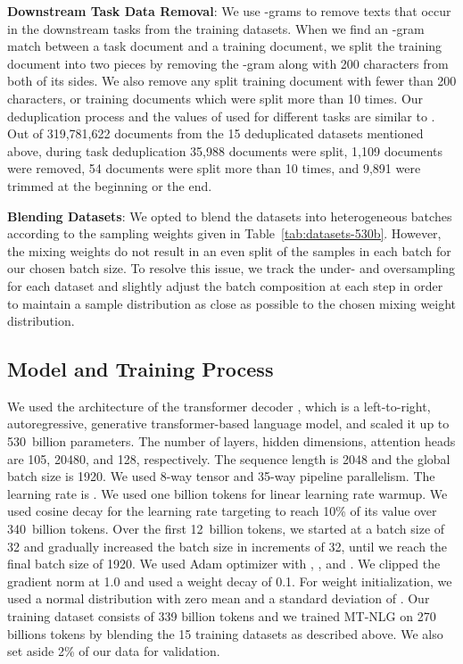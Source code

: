 \documentclass[11pt]{article}
\newcommand{\ours}{MT-NLG}
\begin{document}
\textbf{Downstream Task Data Removal}: We use -grams to remove texts that occur in the downstream tasks from the training datasets. When we find an -gram match between a task document and a training document, we split the training document into two pieces by removing the -gram along with 200 characters from both of its sides. We also remove any split training document with fewer than 200 characters, or training documents which were split more than 10 times. Our deduplication process and the values of  used for different tasks are similar to \cite{brown2020language}. Out of 319,781,622 documents from the 15 deduplicated datasets mentioned above, during task deduplication 35,988 documents were split, 1,109 documents were removed, 54 documents were split more than 10 times, and 9,891 were trimmed at the beginning or the end.

\textbf{Blending Datasets}: We opted to blend the datasets into heterogeneous batches according to the sampling weights given in Table~\ref{tab:datasets-530b}. However, the mixing weights do not result in an even split of the samples in each batch for our chosen batch size. To resolve this issue, we track the under- and oversampling for each dataset and slightly adjust the batch composition at each step in order to maintain a sample distribution as close as possible to the chosen mixing weight distribution. 

\subsection{Model and Training Process}
\label{sec:modelconfig}

We used the architecture of the transformer decoder \cite{gpt2-radford2019language}, which is a left-to-right, autoregressive, generative transformer-based language model, and scaled it up to 530~billion parameters.
The number of layers, hidden dimensions, attention heads are 105, 20480, and 128, respectively. The sequence length is 2048 and the global batch size is 1920. We used 8-way tensor and 35-way pipeline parallelism. The learning rate is . We used one billion tokens for linear learning rate warmup. We used cosine decay for the learning rate targeting to reach 10\% of its value over 340~billion tokens. Over the first 12~billion tokens, we started at a batch size of 32 and gradually increased the batch size in increments of 32, until we reach the final batch size of 1920.
We used Adam optimizer with , , and . We clipped the gradient norm at 1.0 and used a weight decay of 0.1. For weight initialization, we used a normal distribution with zero mean and a standard deviation of . Our training dataset consists of 339 billion tokens and we trained {\ours} on 270 billions tokens  by blending the 15 training datasets as described above. We also set aside 2\% of our data for validation.
\end{document}
